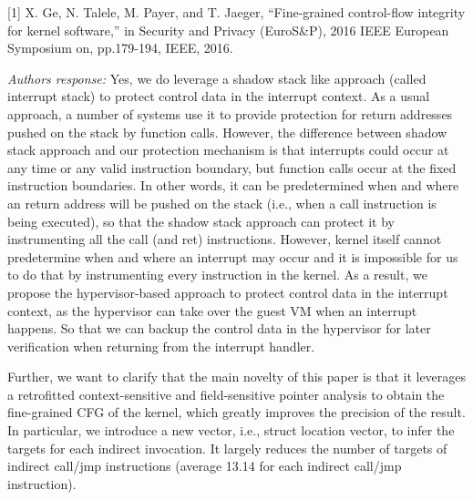 \documentclass[oneside, 11pt]{article}
\begin{document}
[1] X. Ge, N. Talele, M. Payer, and T. Jaeger, ``Fine-grained control-flow
integrity for kernel software,'' in Security and Privacy (EuroS\&P), 2016 IEEE
European Symposium on, pp.179-194, IEEE, 2016.


\smallskip
\smallskip
\smallskip
{}

{\em Authors response:}
Yes, we do leverage a shadow stack like approach (called interrupt
stack) to protect control data in the interrupt context.
As a usual approach, a number of systems use it to provide protection
for return addresses pushed on the stack by function calls.
However, the difference between shadow stack approach and our protection
mechanism is that interrupts could occur at any time or any valid
instruction boundary, but function calls occur at the fixed
instruction boundaries. In other words, it can be predetermined
when and where an return address will be pushed on the stack
(i.e., when a call instruction is being executed), so that the shadow
stack approach can protect it by instrumenting all the call (and ret)
instructions. However, kernel itself cannot predetermine when and where
an interrupt may occur and it is impossible for us to do that by
instrumenting every instruction in the kernel. As a result, we propose
the hypervisor-based approach to protect control data in the interrupt
context, as the hypervisor can take over the guest VM when an interrupt
happens. So that we can backup the control data in the hypervisor for
later verification when returning from the interrupt handler.

Further, we want to clarify that the main novelty of this paper
is that it leverages a retrofitted context-sensitive and field-sensitive
pointer analysis to obtain the fine-grained CFG of the kernel, which
greatly improves the precision of the result. In particular, we
introduce a new vector, i.e., struct location vector, to infer the targets
for each indirect invocation. It largely reduces the number of targets of
indirect call/jmp instructions (average 13.14 for each indirect call/jmp
instruction).
\end{document}
